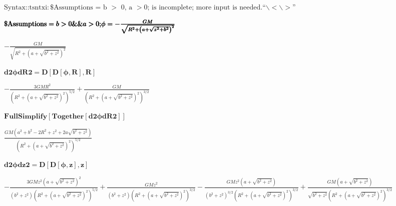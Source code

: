 \documentclass{article}
\newcommand{\unicode}[1]{{}}
\begin{document}
\noindent\(\text{Syntax}\text{::}\text{tsntxi}: \text{$\unicode{f3b5}\unicode{f7c1}\unicode{f7c9}\$$Assumptions = b $>$ 0, $\unicode{f7c9}$a $>$
0;$\unicode{f7c0}\unicode{f7c0}$ is incomplete; more input is needed.$\unicode{f7c1}\unicode{f7c9}${``}$\backslash <\backslash >${''}$\unicode{f7c0}\unicode{f3b5}$}\)

\begin{doublespace}
\noindent\(\pmb{\text{$\$$Assumptions}=b>0 \&\& a>0;}\\
\pmb{\phi  = -\frac{G M}{\sqrt{R^2+\left(a+\sqrt{z^2+b^2}\right)^2}}}\)
\end{doublespace}

\begin{doublespace}
\noindent\(-\frac{G M}{\sqrt{R^2+\left(a+\sqrt{b^2+z^2}\right)^2}}\)
\end{doublespace}

\begin{doublespace}
\noindent\(\pmb{\text{d2$\phi $dR2} = D[D[\phi ,R],R]}\)
\end{doublespace}

\begin{doublespace}
\noindent\(-\frac{3 G M R^2}{\left(R^2+\left(a+\sqrt{b^2+z^2}\right)^2\right)^{5/2}}+\frac{G M}{\left(R^2+\left(a+\sqrt{b^2+z^2}\right)^2\right)^{3/2}}\)
\end{doublespace}

\begin{doublespace}
\noindent\(\pmb{\text{FullSimplify}[\text{Together}[\text{d2$\phi $dR2}]]}\)
\end{doublespace}

\begin{doublespace}
\noindent\(\frac{G M \left(a^2+b^2-2 R^2+z^2+2 a \sqrt{b^2+z^2}\right)}{\left(R^2+\left(a+\sqrt{b^2+z^2}\right)^2\right)^{5/2}}\)
\end{doublespace}

\begin{doublespace}
\noindent\(\pmb{\text{d2$\phi $dz2} = D[D[\phi ,z],z]}\)
\end{doublespace}

\begin{doublespace}
\noindent\(-\frac{3 G M z^2 \left(a+\sqrt{b^2+z^2}\right)^2}{\left(b^2+z^2\right) \left(R^2+\left(a+\sqrt{b^2+z^2}\right)^2\right)^{5/2}}+\frac{G
M z^2}{\left(b^2+z^2\right) \left(R^2+\left(a+\sqrt{b^2+z^2}\right)^2\right)^{3/2}}-\frac{G M z^2 \left(a+\sqrt{b^2+z^2}\right)}{\left(b^2+z^2\right)^{3/2}
\left(R^2+\left(a+\sqrt{b^2+z^2}\right)^2\right)^{3/2}}+\frac{G M \left(a+\sqrt{b^2+z^2}\right)}{\sqrt{b^2+z^2} \left(R^2+\left(a+\sqrt{b^2+z^2}\right)^2\right)^{3/2}}\)
\end{doublespace}
\end{document}
